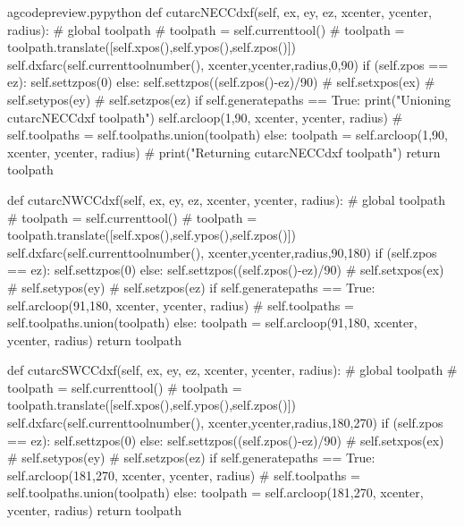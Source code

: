 \documentclass{ltxdoc}
\begin{document}
\lstset{firstnumber=\thegcpy}
\begin{writecode}{a}{gcodepreview.py}{python}
    def cutarcNECCdxf(self, ex, ey, ez, xcenter, ycenter, radius):
#        global toolpath
#        toolpath = self.currenttool()
#        toolpath = toolpath.translate([self.xpos(),self.ypos(),self.zpos()])
        self.dxfarc(self.currenttoolnumber(), xcenter,ycenter,radius,0,90)
        if (self.zpos == ez):
            self.settzpos(0)
        else:         
            self.settzpos((self.zpos()-ez)/90)
#        self.setxpos(ex)
#        self.setypos(ey)
#        self.setzpos(ez)
        if self.generatepaths == True:
            print("Unioning cutarcNECCdxf toolpath")
            self.arcloop(1,90, xcenter, ycenter, radius)
#            self.toolpaths = self.toolpaths.union(toolpath)
        else:
            toolpath = self.arcloop(1,90, xcenter, ycenter, radius)
#            print("Returning cutarcNECCdxf toolpath")
            return toolpath

    def cutarcNWCCdxf(self, ex, ey, ez, xcenter, ycenter, radius):
#        global toolpath
#        toolpath = self.currenttool()
#        toolpath = toolpath.translate([self.xpos(),self.ypos(),self.zpos()])
        self.dxfarc(self.currenttoolnumber(), xcenter,ycenter,radius,90,180)
        if (self.zpos == ez):
            self.settzpos(0)
        else:         
            self.settzpos((self.zpos()-ez)/90)
#        self.setxpos(ex)
#        self.setypos(ey)
#        self.setzpos(ez)
        if self.generatepaths == True:
            self.arcloop(91,180, xcenter, ycenter, radius)
#            self.toolpaths = self.toolpaths.union(toolpath)
        else:
            toolpath = self.arcloop(91,180, xcenter, ycenter, radius)
            return toolpath

    def cutarcSWCCdxf(self, ex, ey, ez, xcenter, ycenter, radius):
#        global toolpath
#        toolpath = self.currenttool()
#        toolpath = toolpath.translate([self.xpos(),self.ypos(),self.zpos()])
        self.dxfarc(self.currenttoolnumber(), xcenter,ycenter,radius,180,270)
        if (self.zpos == ez):
            self.settzpos(0)
        else:         
            self.settzpos((self.zpos()-ez)/90)
#        self.setxpos(ex)
#        self.setypos(ey)
#        self.setzpos(ez)
        if self.generatepaths == True:
            self.arcloop(181,270, xcenter, ycenter, radius)
#            self.toolpaths = self.toolpaths.union(toolpath)
        else:
            toolpath = self.arcloop(181,270, xcenter, ycenter, radius)
            return toolpath


\end{writecode}
\end{document}
